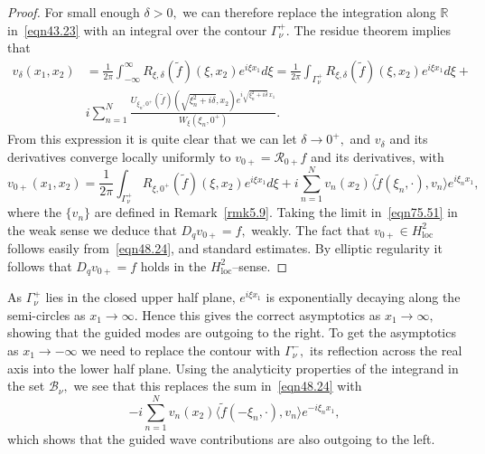 \documentclass[11pt]{article}
\newcommand\loc{\operatorname{loc}}
\newcommand\cB{\mathcal B}
\newcommand\cR{\mathcal R}
\newcommand\tf{\tilde{f}}
\newcommand\bbR{\mathbb R}
\theoremstyle{definition}
\theoremstyle{remark}
\begin{document}
\begin{proof}
For small enough $\delta>0,$ we can therefore replace the integration along $\bbR$
in~\eqref{eqn43.23}  with an integral over the contour
$\Gamma_{\nu}^+.$ The residue theorem implies that 
\begin{equation}\label{eqn47.24}
  \begin{split}
v_{\delta}(x_1,x_2)&= \frac{1}{2\pi}
\int_{-\infty}^{\infty}R_{\xi,\delta}(\tf)(\xi,x_2)e^{i\xi x_1}d\xi
=\frac{1}{2\pi}
\int_{\Gamma^+_{\nu}}R_{\xi,\delta}(\tf)(\xi,x_2)e^{i\xi x_1}d\xi  +\\
&i\sum_{n=1}^{N}\frac{U_{\xi_n,0^+}(\tf)
  (\sqrt{\xi_n^2+i\delta},x_2)e^{i\sqrt{\xi_n^2+i\delta}\, x_1}}{
  W_{\xi}(\xi_n,0^+)}.
\end{split}
\end{equation}
From this expression it is quite clear that we can let $\delta\to
0^+,$ and $v_{\delta}$ and its derivatives converge locally uniformly
to $v_{0+}=\cR_{0+}f$ and its derivatives, with
\begin{equation}\label{eqn48.24}
 v_{0+}(x_1,x_2)=\frac{1}{2\pi}
\int_{\Gamma^+_\nu}R_{\xi,0^+}(\tf)(\xi,x_2)e^{i\xi x_1}d\xi  +
i\sum_{n=1}^{N}  v_n(x_2)\langle \tf(\xi_n,\cdot), v_n\rangle e^{i\xi_n  x_1},
\end{equation}
where the $\{v_n\}$ are defined in Remark~\ref{rmk5.9}. 
Taking the limit in~\eqref{eqn75.51} in the weak sense we deduce that
$D_{q}v_{0+}=f,$ weakly.  The fact that $v_{0+}\in H^2_{\loc}$ follows
easily from~\eqref{eqn48.24}, and standard estimates. By elliptic regularity it follows that
$D_{q}v_{0+}=f$ holds in the $H^2_{\loc}$--sense.
\end{proof}

As $\Gamma^+_{\nu}$ lies in the closed upper half plane, $e^{i\xi x_1}$ is
exponentially decaying along the semi-circles as $x_1\to\infty.$ Hence this
gives the correct asymptotics as $x_1\to\infty,$ showing that the guided modes
are outgoing to the right. To get the asymptotics as $x_1\to -\infty$ we need to
replace the contour with $\Gamma_{\nu}^-,$ its reflection across the real axis
into the lower half plane. Using the analyticity properties of the integrand in
the set $\cB_{\nu},$ we see that this replaces the sum in~\eqref{eqn48.24} with
\begin{equation}
  -i\sum_{n=1}^{N}  v_n(x_2)\langle \tf(-\xi_n,\cdot), v_n\rangle e^{-i\xi_n
      x_1},
\end{equation}
which shows that the guided wave contributions are also outgoing to the left.
\end{document}
